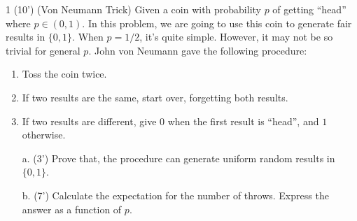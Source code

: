 
    \begin{question}{1 (10') (Von Neumann Trick)}
    Given a coin with probability $p$ of getting ``head'' where $p\in(0,1)$. In this problem, we are going to use this coin to generate fair results in $\{0,1\}$. When $p=1/2$, it's quite simple. However, it may not be so trivial for general $p$. John von Neumann gave the following procedure:
    \begin{enumerate}
        \item Toss the coin twice.
        \item If two results are the same, start over, forgetting both results.
        \item If two results are different, give $0$ when the first result is ``head'', and $1$ otherwise.
    \end{enumerate}
    
    \begin{itemize}
        \item[a. (3')] Prove that, the procedure can generate uniform random results in $\{0,1\}$.
        \item[b. (7')] Calculate the expectation for the number of throws. Express the answer as a function of $p$.
    \end{itemize}
    \end{question}

